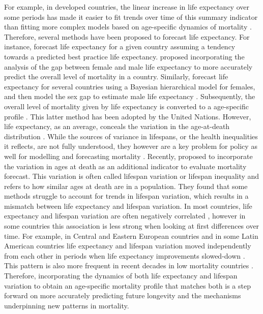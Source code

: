 \documentclass[12pt,a4paper,twoside]{article}
\begin{document}
For example, in developed countries, the linear increase in life expectancy over some periods has made it easier to fit trends over time of this summary indicator than fitting more complex models based on age-specific dynamics of mortality \citep{White200259}. Therefore, several methods have been proposed to forecast life expectancy. For instance, \citet{torri2012forecasting} forecast life expectancy for a given country assuming a tendency towards a predicted best practice life expectancy. \citet{pascariu2018double} proposed incorporating the analysis of the gap between female and male life expectancy to more accurately predict the overall level of mortality in a country. Similarly, \citet{Raftery2013} forecast life expectancy for several countries using a Bayesian hierarchical model for females, and then model the sex gap to estimate male life expectancy \citep{raftery2014joint}. Subsequently, the overall level of mortality given by life expectancy is converted to a age-specific profile \citep{vsevvcikova2016age}. This latter method has been adopted by the United Nations. However, life expectancy, as an average, conceals the variation in the age-at-death distribution \citep{van2018case}. While the sources of variance in lifespans, or the health inequalities it reflects, are not fully understood, they however are a key problem for policy as well for modelling and forecasting mortality \citep{tuljapurkar2011variance}. Recently, \citet{bohk2017lifespan} proposed to incorporate the variation in ages at death as an additional indicator to evaluate mortality forecast. This variation is often called lifespan variation or lifespan inequality and refers to how similar ages at death are in a population.
They found that some methods struggle to account for trends in lifespan variation, which results in a mismatch between life expectancy and lifespan variation. In most countries, life expectancy and lifespan variation are often negatively correlated \citep{Smits2009,Vaupel2011,colchero2016emergence, alvarez2019latin, gonzaga2018compression}, however in some countries this association is less strong when looking at first differences over time. For example, in Central and Eastern European countries and in some Latin American countries life expectancy and lifespan variation moved independently from each other in periods when life expectancy improvements slowed-down \citep{Aburto2018Eastern,aburto2019upsurge,garcia2019impact}. This pattern is also more frequent in recent decades in low mortality countries \citep{aburtoDynamics2019}. Therefore, incorporating the dynamics of both life expectancy and lifespan variation to obtain an age-specific mortality profile that matches both is a step forward on more accurately predicting future longevity and the mechanisms underpinning new patterns in mortality.
\end{document}
